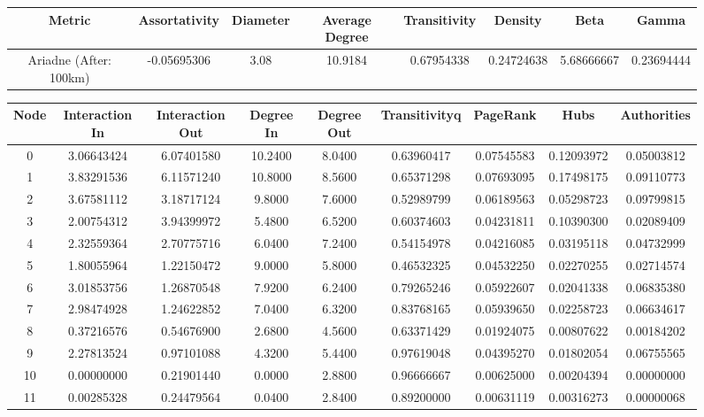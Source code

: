 \documentclass[12pt,a4paper]{thesis}
\begin{document}
\begin{figure}[H]
\centering
\tiny
\begin{tabular}{|c|c|c|c|c|c|c|c|}
\hline Metric & Assortativity & Diameter & Average Degree & Transitivity & Density & Beta & Gamma \\ 
\hline Ariadne (After: 100km) & -0.05695306	& 3.08 & 10.9184 & 0.67954338 &	0.24724638 & 5.68666667	& 0.23694444
 \\ 
\hline 
\end{tabular} 
\end{figure}

\begin{figure}[H]
\centering
\tiny
\begin{tabular}{|c|c|c|c|c|c|c|c|c|}
\hline	Node	&	Interaction In	&	Interaction Out	&	Degree In	&	Degree Out	&	Transitivityq	&	PageRank	&	Hubs	&	Authorities	\\
\hline	0	&	3.06643424	&	6.07401580	&	10.2400	&	8.0400	&	0.63960417	&	0.07545583	&	0.12093972	&	0.05003812	\\
\hline	1	&	3.83291536	&	6.11571240	&	10.8000	&	8.5600	&	0.65371298	&	0.07693095	&	0.17498175	&	0.09110773	\\
\hline	2	&	3.67581112	&	3.18717124	&	9.8000	&	7.6000	&	0.52989799	&	0.06189563	&	0.05298723	&	0.09799815	\\
\hline	3	&	2.00754312	&	3.94399972	&	5.4800	&	6.5200	&	0.60374603	&	0.04231811	&	0.10390300	&	0.02089409	\\
\hline	4	&	2.32559364	&	2.70775716	&	6.0400	&	7.2400	&	0.54154978	&	0.04216085	&	0.03195118	&	0.04732999	\\
\hline	5	&	1.80055964	&	1.22150472	&	9.0000	&	5.8000	&	0.46532325	&	0.04532250	&	0.02270255	&	0.02714574	\\
\hline	6	&	3.01853756	&	1.26870548	&	7.9200	&	6.2400	&	0.79265246	&	0.05922607	&	0.02041338	&	0.06835380	\\
\hline	7	&	2.98474928	&	1.24622852	&	7.0400	&	6.3200	&	0.83768165	&	0.05939650	&	0.02258723	&	0.06634617	\\
\hline	8	&	0.37216576	&	0.54676900	&	2.6800	&	4.5600	&	0.63371429	&	0.01924075	&	0.00807622	&	0.00184202	\\
\hline	9	&	2.27813524	&	0.97101088	&	4.3200	&	5.4400	&	0.97619048	&	0.04395270	&	0.01802054	&	0.06755565	\\
\hline	10	&	0.00000000	&	0.21901440	&	0.0000	&	2.8800	&	0.96666667	&	0.00625000	&	0.00204394	&	0.00000000	\\
\hline	11	&	0.00285328	&	0.24479564	&	0.0400	&	2.8400	&	0.89200000	&	0.00631119	&	0.00316273	&	0.00000068	\\

\end{tabular}
\end{figure}
\end{document}

